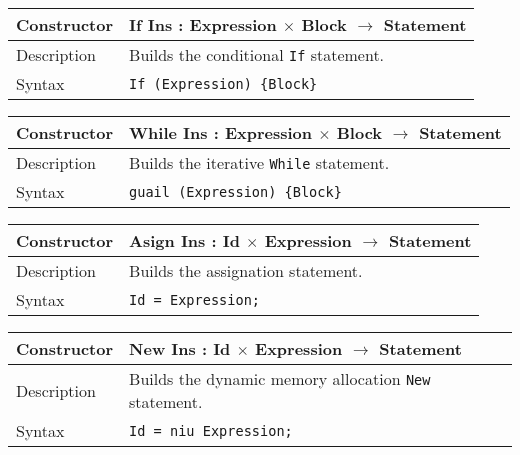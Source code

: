 \documentclass[10pt,a4paper]{article}
\begin{document}
\begin{center}
    \begin{tabular}[h]{|p{}|p{}|}
        \hline
        Constructor & If Ins : Expression $\times$ Block $\rightarrow$ Statement \\
        \hline
        Description & Builds the conditional \texttt{If} statement. \\
        \hline
        Syntax & \texttt{If (Expression) \{Block\}} \\
        \hline
    \end{tabular}
\end{center}

\begin{center}
    \begin{tabular}[h]{|p{}|p{}|}
        \hline
        Constructor & While Ins : Expression $\times$ Block $\rightarrow$ Statement \\
        \hline
        Description & Builds the iterative \texttt{While} statement. \\
        \hline
        Syntax & \texttt{guail (Expression) \{Block\}} \\
        \hline
    \end{tabular}
\end{center}

\begin{center}
    \begin{tabular}[h]{|p{}|p{}|}
        \hline
        Constructor & Asign Ins : Id $\times$ Expression $\rightarrow$ Statement \\
        \hline
        Description & Builds the assignation statement. \\
        \hline
        Syntax & \texttt{Id = Expression;} \\
        \hline
    \end{tabular}
\end{center}

\begin{center}
    \begin{tabular}[h]{|p{}|p{}|}
        \hline
        Constructor & New Ins : Id $\times$ Expression $\rightarrow$ Statement \\
        \hline
        Description & Builds the dynamic memory allocation \texttt{New} statement. \\
        \hline
        Syntax & \texttt{Id = niu Expression;} \\
        \hline
    \end{tabular}
\end{center}
\end{document}
